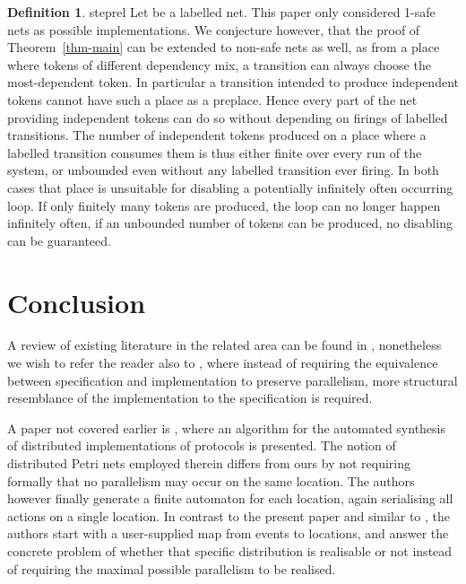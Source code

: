 \documentclass[submission,copyright,creativecommons]{eptcs}
\theoremstyle{definition}
\newtheorem{definition}{Definition}
\def\theoremname{Theorem}
\newcommand{\refthm}[1]{\theoremname~\ref{thm-#1}}
\begin{document}
\begin{definition}{steprel}{
  Let  be a labelled net.
  }
This paper only considered 1-safe nets as possible implementations. We conjecture however, that the
proof of \refthm{main} can be extended to non-safe nets as well, as from a place where tokens of different
dependency mix, a transition can always choose the most-dependent token.
In particular a transition intended to produce independent tokens cannot have such a place as a preplace.
Hence every part of the net providing
independent tokens can do so without depending on firings of labelled transitions.
The number of independent tokens produced on a place where a labelled transition consumes
them is thus either finite over every run of the system, or unbounded even without any labelled
transition ever firing. In both cases that place is unsuitable for disabling a potentially
infinitely often occurring loop. If only finitely many tokens are produced, the loop can no longer
happen infinitely often, if an unbounded number of tokens can be produced, no disabling can
be guaranteed.

\section{Conclusion}\label{sec-conclusion}

A review of existing literature in the related area can be found in
\cite{glabbeek08syncasyncinteraction}, nonetheless we wish to refer the reader also to
\cite{hopkins91distnets}, where instead of requiring the equivalence between
specification and implementation to
preserve parallelism, more structural resemblance of the implementation to the
specification is required.

A paper not covered earlier is \cite{badouel02distributing}, where an algorithm for the
automated synthesis of distributed implementations of protocols is presented.
The notion of distributed Petri nets employed therein differs from ours by not
requiring formally that no parallelism may occur on the same location. The authors
however finally generate a finite automaton for each location, again serialising all
actions on a single location. In contrast to the present paper and similar to
\cite{hopkins91distnets}, the authors start with a user-supplied map from
events to locations, and answer the concrete problem of whether that specific
distribution is realisable or not instead of requiring the maximal possible
parallelism to be realised.


\end{definition}
\end{document}
